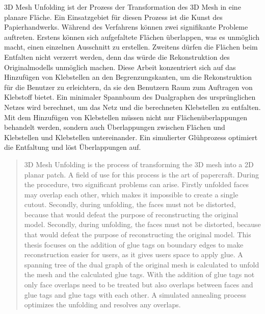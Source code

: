\documentclass[draft,final]{vutinfth} %
\begin{document}
\begin{kurzfassung}
3D Mesh Unfolding ist der Prozess der Transformation des 3D Mesh in eine planare Fläche. Ein Einsatzgebiet für diesen Prozess ist die Kunst des Papierhandwerks. Während des Verfahrens können zwei signifikante Probleme auftreten. Erstens können sich aufgefaltete Flächen überlappen, was es unmöglich macht, einen einzelnen Ausschnitt zu erstellen. Zweitens dürfen die Flächen beim Entfalten nicht verzerrt werden, denn das würde die Rekonstruktion des Originalmodells unmöglich machen. Diese Arbeit konzentriert sich auf das Hinzufügen von Klebstellen an den Begrenzungskanten, um die Rekonstruktion für die Benutzer zu erleichtern, da sie den Benutzern Raum zum Auftragen von Klebstoff bietet. Ein minimaler Spannbaum des Dualgraphen des ursprünglichen Netzes wird berechnet, um das Netz und die berechneten Klebstellen zu entfalten. Mit dem Hinzufügen von Klebstellen müssen nicht nur Flächenüberlappungen behandelt werden, sondern auch Überlappungen zwischen Flächen und Klebstellen und Klebstellen untereinander. Ein simulierter Glühprozess optimiert die Entfaltung und löst Überlappungen auf.
\end{kurzfassung}

\begin{abstract}
3D Mesh Unfolding is the process of transforming the 3D mesh into a 2D planar patch. A field of use for this process is the art of papercraft. During the procedure, two significant problems can arise. Firstly unfolded faces may overlap each other, which makes it impossible to create a single cutout. Secondly, during unfolding, the faces must not be distorted, because that would defeat the purpose of reconstructing the original model. Secondly, during unfolding, the faces must not be distorted, because that would defeat the purpose of reconstructing the original model. This thesis focuses on the addition of glue tags on boundary edges to make reconstruction easier for users, as it gives users space to apply glue. A spanning tree of the dual graph of the original mesh is calculated to unfold the mesh and the calculated glue tags. With the addition of glue tags not only face overlaps need to be treated but also overlaps between faces and glue tags and glue tags with each other. A simulated annealing process optimizes the unfolding and resolves any overlaps.
\end{abstract}

\end{document}
